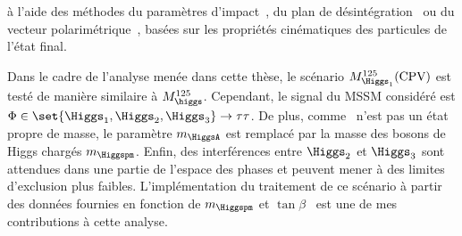 à l'aide des méthodes du paramètres d'impact~\cite{BERGE2013488}, du plan de désintégration~\cite{Desch_2004} ou du vecteur polarimétrique~\cite{Cherepanov_cpv},
basées sur les propriétés cinématiques des particules de l'état final.
\par
Dans le cadre de l'analyse menée dans cette thèse,
le scénario $M_{\Higgs_1}^{125}(\text{CPV})$ est testé de manière similaire à $M_{\higgs}^{125}$.
Cependant,
le signal du MSSM considéré est
$\Phi\in\set{\Higgs_1,\Higgs_2,\Higgs_3}\to\tau\tau$.
De plus, comme \HiggsA\ n'est pas un état propre de masse,
le paramètre $m_{\HiggsA}$ est remplacé par la masse des bosons de Higgs chargés $m_{\Higgspm}$.
Enfin, des interférences entre $\Higgs_2$ et $\Higgs_3$ sont attendues dans une partie de l'espace des phases et peuvent mener à des limites d'exclusion plus faibles.
L'implémentation du traitement de ce scénario à partir des données fournies en fonction de $m_{\Higgspm}$ et $\tan\beta$~\cite{MSSMneutralHiggsTwiki}
est une de mes contributions à cette analyse.
